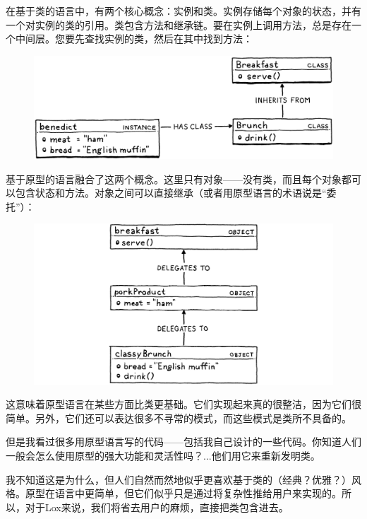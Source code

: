 \documentclass[cn,11pt,chinese]{elegantbook}
\begin{document}
在基于类的语言中，有两个核心概念：实例和类。实例存储每个对象的状态，并有一个对实例的类的引用。类包含方法和继承链。要在实例上调用方法，总是存在一个中间层。您要先查找实例的类，然后在其中找到方法：

\begin{figure}[htbp]
  \centering
  \includegraphics[width=\textwidth]{image/the-lox-language/class-lookup.png}
\end{figure}

基于原型的语言融合了这两个概念。这里只有对象——没有类，而且每个对象都可以包含状态和方法。对象之间可以直接继承（或者用原型语言的术语说是“委托”）：

\begin{figure}[htbp]
  \centering
  \includegraphics[width=\textwidth]{image/the-lox-language/prototype-lookup.png}
\end{figure}

这意味着原型语言在某些方面比类更基础。它们实现起来真的很整洁，因为它们很简单。另外，它们还可以表达很多不寻常的模式，而这些模式是类所不具备的。

但是我看过很多用原型语言写的代码——包括我自己设计的一些代码。你知道人们一般会怎么使用原型的强大功能和灵活性吗？...他们用它来重新发明类。

我不知道这是为什么，但人们自然而然地似乎更喜欢基于类的（经典？优雅？）风格。原型在语言中更简单，但它们似乎只是通过将复杂性推给用户来实现的。所以，对于Lox来说，我们将省去用户的麻烦，直接把类包含进去。
\end{document}
